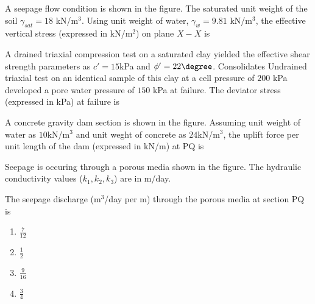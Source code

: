 \iffalse
\author{Manvik Muthyapu - AI24BTECH11021}
\section{ce}
\chapter{2016}
\fi

    \item A seepage flow condition is shown in the figure. The saturated unit weight of the soil $\gamma_{sat}=18$ kN/m$^3$. Using unit weight of water, $\gamma_{w} = 9.81$ kN/m$^3$, the effective vertical stress (expressed in kN/m$^2$) on plane $X-X$ is \underline{\hspace{2cm}}\\
    \begin{figure}[h!]
    \centering
     
\end{figure}

    \item A drained triaxial compression test on a saturated clay yielded the effective shear strength parameters as $c' = 15$kPa and $\phi' = 22\degree$. Consolidates Undrained triaxial test on an identical sample of this clay at a cell pressure of $200$ kPa developed a pore water pressure of $150$ kPa at failure. The deviator stress (expressed in kPa) at failure is \underline{\hspace{2cm}}

    \item A concrete gravity dam section is shown in the figure. Assuming unit weight of water as $10$kN/m$^3$ and unit weght of concrete as $24$kN/m$^3$, the uplift force per unit length of the dam (expressed in kN/m) at PQ is \underline{\hspace{2cm}}
    \begin{figure}[h!]
        \centering
        
    \end{figure}

    \item Seepage is occuring through a porous media shown in the figure. The hydraulic conductivity values ($k_1, k_2, k_3$) are in m/day. 
    \begin{figure}[h!]
        \centering
        
    \end{figure}
    The seepage discharge (m$^3$/day per m) through the porous media at section PQ is
    \begin{enumerate}
        \item $\frac{7}{12}$
        \item $\frac{1}{2}$
        \item $\frac{9}{16}$
        \item $\frac{3}{4}$
    \end{enumerate}
   


